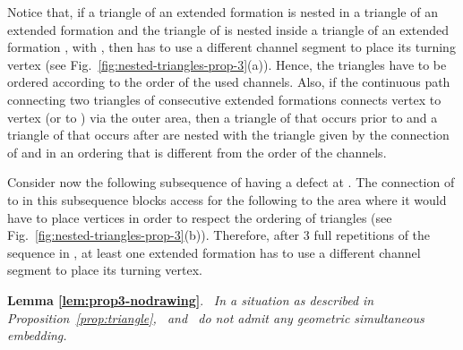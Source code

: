 \documentclass[a4paper,10pt]{llncs}
\newcounter{prop}
\renewenvironment{proof}
{{\bf Proof:}}{\hspace*{\fill}\par\vspace{2mm}}
\newcommand{\rephrase}[3]{\noindent\textbf{#1 #2}.~\emph{#3}}
\newcommand{\T}{\mbox{ }}
\renewcommand{\P}{\mbox{ }}
\begin{document}
\begin{proof}
Notice that, if a triangle of an extended formation  is nested in a triangle of an extended formation  and the triangle of  is nested inside a triangle of an extended formation , with , then  has to use a different channel segment to place its turning vertex (see Fig.~\ref{fig:nested-triangles-prop-3}(a)). Hence, the triangles have to be ordered according to the order of the used channels. Also, if the continuous path connecting two triangles  of consecutive extended formations  connects vertex  to vertex  (or  to ) via the outer area, then a triangle of  that occurs prior to  and a triangle of  that occurs after  are nested with the triangle given by the connection of  and  in an ordering that is different from the order of the channels.

Consider now the following subsequence of  having a defect at . The connection of  to  in this subsequence blocks access for the following  to the area where it would have to place vertices in order to respect the ordering of triangles (see Fig.~\ref{fig:nested-triangles-prop-3}(b)).
Therefore, after 3 full repetitions of the sequence in , at least one extended formation has to use a different channel segment to place its turning vertex.
\end{proof}

\rephrase{Lemma}{\ref{lem:prop3-nodrawing}}{
In a situation as described in Proposition~\ref{prop:triangle}, \T and \P do not admit any geometric simultaneous embedding.
}
\end{document}

